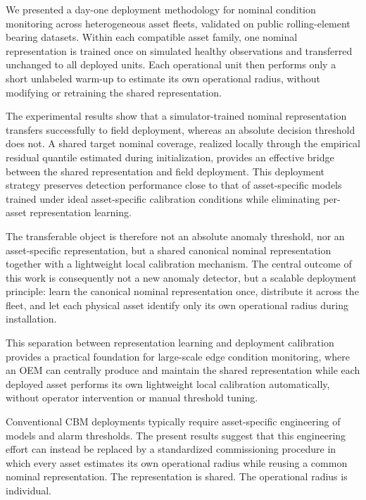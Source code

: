 \documentclass{trbunofficial}
\begin{document}
We presented a day-one deployment methodology for nominal condition monitoring across
heterogeneous asset fleets, validated on public rolling-element bearing datasets. Within each compatible asset family, one nominal representation is trained
once on simulated healthy observations and transferred unchanged to all
deployed units. Each operational unit then performs only a short unlabeled
warm-up to estimate its own operational radius, without modifying or retraining the shared
representation.

The experimental results show that a simulator-trained nominal representation transfers
successfully to field deployment, whereas an absolute decision threshold does not.
A shared target nominal coverage, realized locally through the empirical residual quantile estimated during initialization, 
provides an effective bridge between the shared representation and field deployment. This deployment strategy preserves detection performance
close to that of asset-specific models trained under ideal asset-specific calibration conditions
while eliminating per-asset representation learning.

The transferable object is therefore not an absolute anomaly threshold, nor an asset-specific
representation, but a shared canonical nominal representation together with a lightweight local
calibration mechanism. The central outcome of this work is consequently not a new anomaly
detector, but a scalable deployment principle: learn the canonical nominal representation once, 
distribute it across the fleet, and let each physical asset identify only its own operational
radius during installation.

This separation between representation learning and deployment calibration provides a practical
foundation for large-scale edge condition monitoring, where an OEM can centrally produce and
maintain the shared representation while each deployed asset performs its own lightweight local
calibration automatically, without operator intervention or manual threshold tuning.

Conventional CBM deployments typically require asset-specific engineering of models and alarm thresholds. The present results suggest that this engineering effort can instead be replaced by a standardized commissioning procedure in which every asset estimates its own operational radius while reusing a common nominal representation.
The representation is shared. The operational radius is individual.

\end{document}

